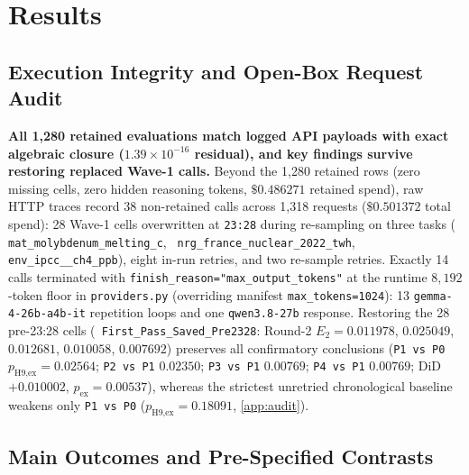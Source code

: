 \documentclass[11pt,letterpaper]{article}
\theoremstyle{plain}
\newcommand{\code}[1]{\nolinkurl{#1}}
\newcommand{\taskid}[1]{\texttt{\small\hyphenpenalty=50 #1}}
\begin{document}
\section{Results}

\subsection{Execution Integrity and Open-Box Request Audit}

\noindent\textbf{All 1,280 retained evaluations match logged API payloads with exact algebraic closure ($1.39 \times 10^{-16}$ residual), and key findings survive restoring replaced Wave-1 calls.} Beyond the 1,280 retained rows (zero missing cells, zero hidden reasoning tokens, $\$0.486271$ retained spend), raw HTTP traces record 38 non-retained calls across 1,318 requests ($\$0.501372$ total spend): 28 Wave-1 cells overwritten at \texttt{23:28} during re-sampling on three tasks (\taskid{mat\_molybdenum\_\allowbreak melting\_c}, \taskid{nrg\_france\_\allowbreak nuclear\_2022\_twh}, \taskid{env\_ipcc\_\_ch4\_ppb}), eight in-run retries, and two re-sample retries. Exactly 14 calls terminated with \code{finish\_reason="max\_output\_tokens"} at the runtime $8{,}192$-token floor in \code{providers.py} (overriding manifest \code{max\_tokens=1024}): 13 \texttt{gemma-4-26b-a4b-it} repetition loops and one \texttt{qwen3.8-27b} response. Restoring the 28 pre-23:28 cells (\taskid{First\_Pass\_\allowbreak Saved\_Pre2328}: Round-2 $E_2 = 0.011978$, $0.025049$, $0.012681$, $0.010058$, $0.007692$) preserves all confirmatory conclusions (\texttt{P1 vs P0} $p_{\text{H9,ex}}=0.02564$; \texttt{P2 vs P1} $0.02350$; \texttt{P3 vs P1} $0.00769$; \texttt{P4 vs P1} $0.00769$; DiD $+0.010002$, $p_{\text{ex}}=0.00537$), whereas the strictest unretried chronological baseline weakens only \texttt{P1 vs P0} ($p_{\text{H9,ex}}=0.18091$, \cref{app:audit}).

\subsection{Main Outcomes and Pre-Specified Contrasts}
\end{document}
